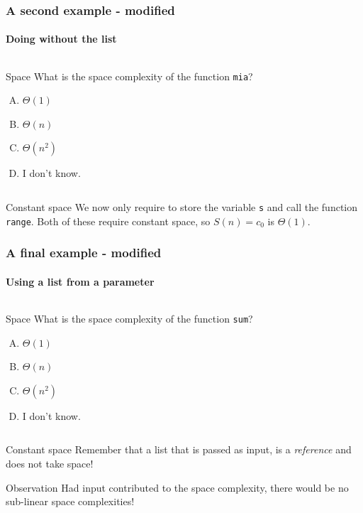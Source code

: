 \begin{frame}
	\frametitle{A second example - modified}
	\framesubtitle{Doing without the list}
	
	\begin{columns}
		
		\pause
		\begin{questionblock}{Space}
			What is the space complexity of the function \texttt{mia}?
			\begin{enumerate}[A.]
				\item $\Theta(1)$
				\item $\Theta(n)$ 
				\item $\Theta(n^2)$
				\item I don't know.
			\end{enumerate}
		\end{questionblock}
	\end{columns}
	\pause
	\begin{answerblock}{Constant space}
		We now only require to store the variable \texttt{s} and call the function \texttt{range}. Both of these require
		constant space, so $S(n) = c_0$ is $\Theta(1)$.
	\end{answerblock}
\end{frame}

\begin{frame}
	\frametitle{A final example - modified}
	\framesubtitle{Using a list from a parameter}
	
	\begin{columns}
		\column{0.455\textwidth}
		
		\column{0.455\textwidth}
		\pause
		\begin{questionblock}{Space}
			What is the space complexity of the function \texttt{sum}?
			\begin{enumerate}[A.]
				\item $\Theta(1)$
				\item $\Theta(n)$ 
				\item $\Theta(n^2)$
				\item I don't know.
			\end{enumerate}
		\end{questionblock}
	\end{columns}
	\pause
	\begin{answerblock}{Constant space}
		Remember that a list that is passed as input, is a \textit{reference} and does not take space!
	\end{answerblock}
	\pause
		\begin{block}{Observation}
			Had input contributed to the space complexity, there would be no sub-linear space complexities!	
		\end{block}	
\end{frame}

